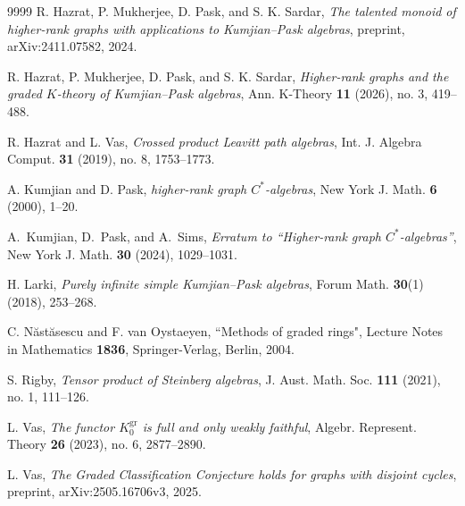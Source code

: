\documentclass[a4paper,reqno,12pt]{amsart}
\numberwithin{equation}{section}
\theoremstyle{definition}
\theoremstyle{remark}
\begin{document}
\begin{thebibliography}{9999}
R. Hazrat, P. Mukherjee, D. Pask, and S. K. Sardar, \emph{The talented monoid of higher-rank graphs with applications to Kumjian--Pask algebras}, preprint, arXiv:2411.07582, 2024.

R. Hazrat, P. Mukherjee, D. Pask, and S. K. Sardar, \emph{Higher-rank graphs and the graded $K$-theory of Kumjian--Pask algebras}, Ann. K-Theory \textbf{11} (2026), no. 3,  419--488.

R. Hazrat and L. Vas, \emph{Crossed product Leavitt path algebras}, Int. J. Algebra Comput. \textbf{31} (2019), no. 8, 1753--1773.

A. Kumjian and D. Pask, \emph{higher-rank graph $C^*$-algebras}, New York J. Math. {\bf 6} (2000), 1--20.

A.~Kumjian, D.~Pask, and A.~Sims, \emph{Erratum to ``Higher-rank graph $C^*$-algebras''}, New York J. Math. \textbf{30} (2024), 1029--1031.

H. Larki, \emph{Purely infinite simple Kumjian--Pask algebras}, Forum Math. \textbf{30}(1) (2018), 253--268.

C. N\u{a}st\u{a}sescu and F. van Oystaeyen, ``Methods of graded rings", Lecture Notes in Mathematics \textbf{1836}, Springer-Verlag, Berlin, 2004. 

S. Rigby, \emph{Tensor product of Steinberg algebras}, J. Aust. Math. Soc. \textbf{111} (2021), no. 1, 111--126.

L. Vas, \emph{The functor $K_0^{\mathrm{gr}}$ is full and only weakly faithful},
Algebr. Represent. Theory {\bf 26} (2023), no. 6, 2877--2890.

L. Vas, \emph{The Graded Classification Conjecture holds for graphs with disjoint cycles}, preprint, arXiv:2505.16706v3, 2025.

\end{thebibliography}
\end{document}
